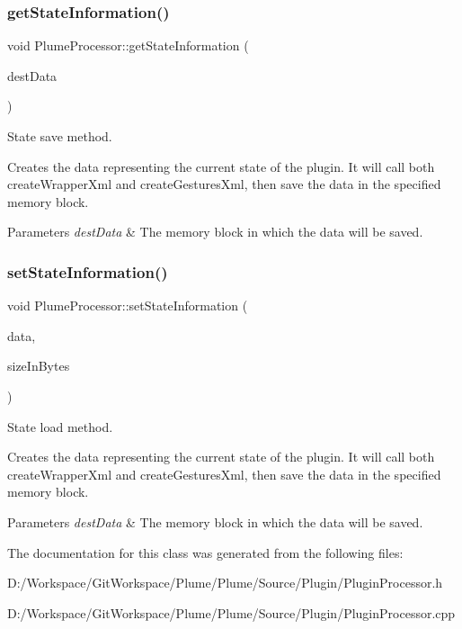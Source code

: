\subsubsection{\texorpdfstring{get\+State\+Information()}{getStateInformation()}}
{\footnotesize\ttfamily void Plume\+Processor\+::get\+State\+Information (\begin{DoxyParamCaption}\item[{Memory\+Block \&}]{dest\+Data }\end{DoxyParamCaption})\hspace{0.3cm}{\ttfamily [override]}}



State save method. 

Creates the data representing the current state of the plugin. It will call both create\+Wrapper\+Xml and create\+Gestures\+Xml, then save the data in the specified memory block.


\begin{DoxyParams}{Parameters}
{\em dest\+Data} & The memory block in which the data will be saved. \\
\hline
\end{DoxyParams}
\mbox{\label{class_plume_processor_aa7ab9da73c37f6db69ea6c7e1e4a0211}} 
\subsubsection{\texorpdfstring{set\+State\+Information()}{setStateInformation()}}
{\footnotesize\ttfamily void Plume\+Processor\+::set\+State\+Information (\begin{DoxyParamCaption}\item[{const void $\ast$}]{data,  }\item[{int}]{size\+In\+Bytes }\end{DoxyParamCaption})\hspace{0.3cm}{\ttfamily [override]}}



State load method. 

Creates the data representing the current state of the plugin. It will call both create\+Wrapper\+Xml and create\+Gestures\+Xml, then save the data in the specified memory block.


\begin{DoxyParams}{Parameters}
{\em dest\+Data} & The memory block in which the data will be saved. \\
\hline
\end{DoxyParams}


The documentation for this class was generated from the following files\+:\begin{DoxyCompactItemize}
\item 
D\+:/\+Workspace/\+Git\+Workspace/\+Plume/\+Plume/\+Source/\+Plugin/Plugin\+Processor.\+h\item 
D\+:/\+Workspace/\+Git\+Workspace/\+Plume/\+Plume/\+Source/\+Plugin/Plugin\+Processor.\+cpp\end{DoxyCompactItemize}
